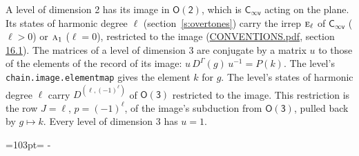 \documentclass[10pt,a4paper]{article}
\newcommand{\needspace}[1]{\par\penalty-100\begingroup\dimen0=#1\relax\dimen2=\pagegoal
  \advance\dimen2-\pagetotal\ifdim\dimen0>\dimen2\relax\ifdim\dimen2>0pt\vfil\break\fi\fi
  \endgroup}
\numberwithin{equation}{section}
\newcommand{\grp}[1]{\mathsf{#1}}
\newcommand{\irr}[1]{\text{\normalfont\scshape #1}}
\newcommand{\irrJp}[2]{D^{(#1,#2)}}
\newcommand{\repD}[1]{D^{#1}}
\begin{document}
A level of dimension 2 has its image in $\grp{O(2)}$, which is \href{Cinfv.pdf}{$\grp{C_{\infty v}}$} acting on the plane. \label{n:index.harmonic.degree}Its states of harmonic degree $\ell$ (section~\ref{s:overtones}) carry the irrep $\irr{e}_{\ell}$ of \href{Cinfv.pdf}{$\grp{C_{\infty v}}$} ($\ell > 0$) or $\irr{a}_{1}$ ($\ell = 0$), restricted to the image (\href{../../CONVENTIONS.pdf}{CONVENTIONS.pdf}, section \href{../../CONVENTIONS.pdf\#conv.16.1}{16.1}).
\leavevmode\label{n:matrix.conjugator}The matrices of a level of dimension 3 are conjugate by a matrix $u$ to those of the elements of the record of its image: $u\,\repD{\Gamma}(g)\,u^{-1} = P(k)$. The level's \texttt{chain.image.elementmap} gives the element $k$ for $g$. The level's states of harmonic degree $\ell$ carry $\irrJp{\ell}{(-1)^{\ell}}$ of \href{O3.pdf}{$\grp{O(3)}$} restricted to the image. This restriction is the row $J = \ell$, $p = (-1)^{\ell}$, of the image's subduction from \href{O3.pdf}{$\grp{O(3)}$}, pulled back by $g \mapsto k$.
Every level of dimension 3 has $u = 1$.
\needspace{103pt}
\end{document}

